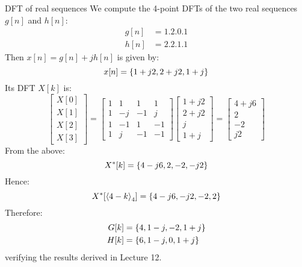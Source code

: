 \documentclass[../../main/main.tex]{subfiles}
\begin{document}
\begin{example}{DFT of real sequences}{}
    We compute the 4-point DFTs of the two real sequences \( g[n] \) and \( h[n] \):
    \begin{align}
        g[n] &= \qty{1,2,0,1}   \\
        h[n] &= \qty{2,2,1,1}
    \end{align}
    Then \( x[n] = g[n] + jh[n] \) is given by:
    \begin{equation}
        x[n]
        =
        \qty{1+j2, 2+j2, 1+j}
        \label{eq:L13_S06_3}
    \end{equation}
    Its DFT \( X[k] \) is:
    \begin{equation}
        \begin{bmatrix}
            X[0]    \\
            X[1]    \\
            X[2]    \\
            X[3]
        \end{bmatrix}
        =
        \begin{bmatrix}
            1   &   1   &   1   &   1   \\
            1   &   -j  &   -1  &   j   \\
            1   &   -1  &   1   &   -1  \\
            1   &   j   &   -1  &   -1
        \end{bmatrix}
        \begin{bmatrix}
            1 + j2  \\
            2 + j2  \\
            j       \\
            1 + j
        \end{bmatrix}
        =
        \begin{bmatrix}
            4 + j6  \\
            2       \\
            -2      \\
            j2
        \end{bmatrix}
        \label{eq:L13_S07_1}
    \end{equation}
    From the above:
    \begin{equation}
        X^{*}[k]
        =
        \qty{4-j6, 2, -2, -j2}
        \label{eq:L13_S07_2}
    \end{equation}
    Hence:
    \begin{equation}
        X^{*}[\expval{4-k}_{4}]
        =
        \qty{4-j6, -j2, -2, 2}
        \label{eq:L13_S07_3}
    \end{equation}
    Therefore:
    \begin{align}
        G[k] &= \qty{4,1-j,-2,1+j}  \\
        H[k] &= \qty{6,1-j, 0,1+j}
    \end{align}
    verifying the results derived in Lecture 12.
\end{example}
\end{document}

